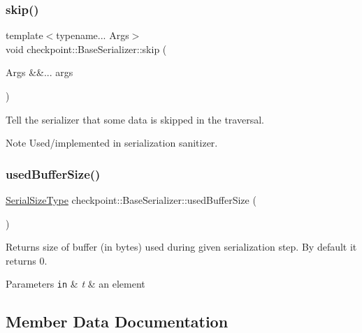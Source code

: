 \subsubsection{\texorpdfstring{skip()}{skip()}}
{\footnotesize\ttfamily template$<$typename... Args$>$ \\
void checkpoint\+::\+Base\+Serializer\+::skip (\begin{DoxyParamCaption}\item[{Args \&\&...}]{args }\end{DoxyParamCaption})\hspace{0.3cm}{\ttfamily [inline]}}



Tell the serializer that some data is skipped in the traversal. 

\begin{DoxyNote}{Note}
Used/implemented in serialization sanitizer. 
\end{DoxyNote}
\mbox{\label{structcheckpoint_1_1_base_serializer_a6ccb8bb1430ac5665aac995b6330bc8a}} 
\subsubsection{\texorpdfstring{used\+Buffer\+Size()}{usedBufferSize()}}
{\footnotesize\ttfamily \hyperlink{namespacecheckpoint_a083f6674da3f94c2901b18c6d238217c}{Serial\+Size\+Type} checkpoint\+::\+Base\+Serializer\+::used\+Buffer\+Size (\begin{DoxyParamCaption}{ }\end{DoxyParamCaption})\hspace{0.3cm}{\ttfamily [inline]}}



Returns size of buffer (in bytes) used during given serialization step. By default it returns 0. 


\begin{DoxyParams}[1]{Parameters}
\mbox{\tt in}  & {\em t} & an element \\
\hline
\end{DoxyParams}


\subsection{Member Data Documentation}
\mbox{\label{structcheckpoint_1_1_base_serializer_a1755296c5fbd3cdc5df3390d20c80fae}} 
